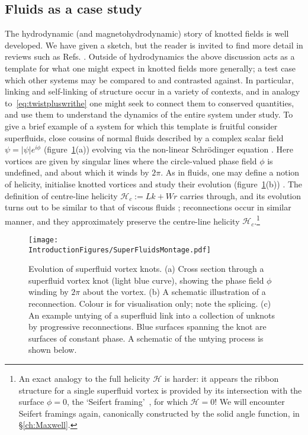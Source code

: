 \subsection{Fluids as a case study}
The hydrodynamic (and magnetohydrodynamic) story of knotted fields is well developed. We have given a sketch, but the reader is invited to find more detail in reviews such as Refs. \citep{Moffatt2014, Irvine2018}. Outside of hydrodynamics the above discussion acts as a template for what one might expect in knotted fields more generally; a test case which other systems may be compared to and contrasted against. In particular, linking and self-linking of structure occur in a variety of contexts, and in analogy to~\eqref{eq:twistpluswrithe} one might seek to connect them to conserved quantities, and use them to understand the dynamics of the entire system under study. To give a brief example of a system for which this template is fruitful consider superfluids, close cousins of normal fluids described by a complex scalar field $\psi = |\psi| e^{i \phi}$ (figure~\ref{fig:SuperFluidMontage}(a)) evolving via the non-linear Schr\"odinger equation \citep{Kleckner2016}. Here vortices are given by singular lines where the circle-valued phase field $\phi$ is undefined, and about which it winds by $2\pi$. As in fluids, one may define a notion of helicity, initialise knotted vortices and study their evolution (figure~\ref{fig:SuperFluidMontage}(b)) \citep{Scheeler2014, Kleckner2016}. The definition of centre-line helicity $\mathcal{H}_c := Lk + Wr$ carries through, and its evolution turns out to be similar to that of viscous fluids \citep{Scheeler2014, Kleckner2016}; reconnections occur in similar manner, and they approximately preserve the centre-line helicity $\mathcal{H}_c$.\footnote{ \label{footnote:Seifert} An exact analogy to the full helicity $\mathcal{H}$ is harder: it appears the ribbon structure for a single superfluid vortex is provided by its intersection with the surface $\phi =0$, the `Seifert framing'~\citep{Winfree1983c,MoffattBook,Salman2016,Salman2017,Kedia2018a}, for which $\mathcal{H}=0$! We will encounter Seifert framings again, canonically constructed by the solid angle function, in \S \ref{ch:Maxwell}.}
\begin{figure}[htbp]
\centering
\texttt{[image: \\IntroductionFigures/SuperFluidsMontage.pdf]}
\caption{Evolution of superfluid vortex knots. (a) Cross section through a superfluid vortex knot (light blue curve), showing the phase field $\phi$ winding by $2 \pi$ about the vortex. (b) A schematic illustration of a reconnection. Colour is for visualisation only; note the splicing. (c) An example untying of a superfluid link into a collection of unknots by progressive reconnections. Blue surfaces spanning the knot are surfaces of constant phase. A schematic of the untying process is shown below.}
\label{fig:SuperFluidMontage}
\end{figure}


